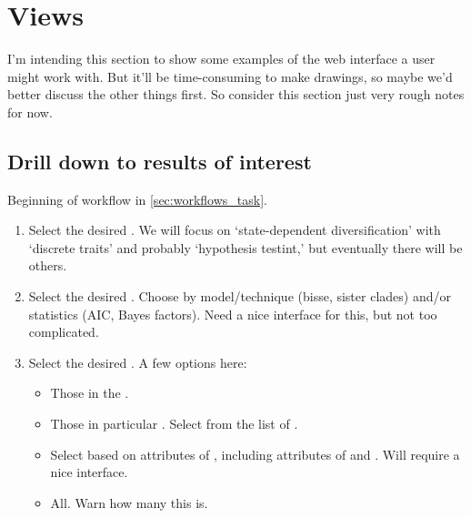 \section{Views}
\label{sec:views}

I'm intending this section to show some examples of the web interface a user might work with.
But it'll be time-consuming to make drawings, so maybe we'd better discuss the other things first.
So consider this section just very rough notes for now.

\subsection{Drill down to results of interest}
\label{sec:views_task}

Beginning of workflow in \cref{sec:workflows_task}.

\begin{enumerate}

    \item Select the desired \Task.
          We will focus on `state-dependent diversification' with `discrete traits' and probably `hypothesis testint,' but eventually there will be others.

    \item Select the desired \Methods.
          Choose by model/technique (\eg bisse, sister clades) and/or statistics (\eg AIC, Bayes factors).
          Need a nice interface for this, but not too complicated.

    \item Select the desired \Elements.  A few options here:
        \begin{itemize}
            \item Those in the \Benchmark.
            \item Those in particular \Refsets.  Select from the list of \Refsets.
            \item Select based on attributes of \Elements, including attributes of \Trees and \Traits.  Will require a nice interface. %
            \item All.  Warn how many this is.
        \end{itemize}
\end{enumerate}

